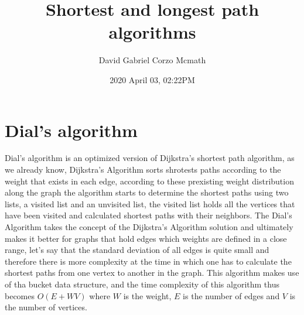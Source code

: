 \documentclass{article}
\title{Shortest and longest path algorithms}
\date{2020 April 03, 02:22PM}
\author{David Gabriel Corzo Mcmath}
\begin{document}
\maketitle

\section{Dial's algorithm}
Dial's algorithm is an optimized version of Dijkstra's shortest path algorithm, as we already know, Dijkstra's Algorithm sorts shrotests paths according to the weight that exists in each edge, according to these prexisting weight distribution along the graph the algorithm starts to determine the shortest paths using two lists, a visited list and an unvisited list, the visited list holds all the vertices that have been visited and calculated shortest paths with their neighbors. The Dial's Algorithm takes the concept of the Dijkstra's Algorithm solution and ultimately makes it better for graphs that hold edges which weights are defined in a close range, let's say that the standard deviation of all edges is quite small and therefore there is more complexity at the time in which one has to calculate the shortest paths from one vertex to another in the graph. This algorithm makes use of tha bucket data structure, and the time complexity of this algorithm thus becomes $O(E+WV)$ where $W$ is the weight, $E$ is the number of edges and $V$ is the number of vertices.
\end{document}

